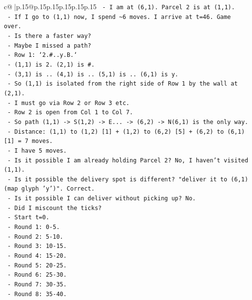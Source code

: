 \documentclass{article}
\begin{document}
{\begin{supertabular}{c@{$\;$}|p{.15\linewidth}@{}p{.15\linewidth}p{.15\linewidth}p{.15\linewidth}p{.15\linewidth}p{.15\linewidth}}
{{{\texttt{    {-} I am at (6,1). Parcel 2 is at (1,1).} \\
\texttt{    {-} If I go to (1,1) now, I spend \textasciitilde{}6 moves. I arrive at t=46. Game over.} \\
\texttt{    {-} Is there a faster way?} \\
\texttt{    {-} Maybe I missed a path?} \\
\texttt{    {-} Row 1: `2.\#..y.B.`} \\
\texttt{      {-} (1,1) is 2. (2,1) is \#.} \\
\texttt{      {-} (3,1) is .. (4,1) is .. (5,1) is .. (6,1) is y.} \\
\texttt{      {-} So (1,1) is isolated from the right side of Row 1 by the wall at (2,1).} \\
\texttt{      {-} I must go via Row 2 or Row 3 etc.} \\
\texttt{      {-} Row 2 is open from Col 1 to Col 7.} \\
\texttt{      {-} So path (1,1) {-}> S(1,2) {-}> E... {-}> (6,2) {-}> N(6,1) is the only way.} \\
\texttt{      {-} Distance: (1,1) to (1,2) {[}1{]} + (1,2) to (6,2) {[}5{]} + (6,2) to (6,1) {[}1{]} = 7 moves.} \\
\texttt{      {-} I have 5 moves.} \\
\texttt{      {-} Is it possible I am already holding Parcel 2? No, I haven't visited (1,1).} \\
\texttt{      {-} Is it possible the delivery spot is different? "deliver it to (6,1) (map glyph 'y')". Correct.} \\
\texttt{      {-} Is it possible I can deliver without picking up? No.} \\
\texttt{      {-} Did I miscount the ticks?} \\
\texttt{        {-} Start t=0.} \\
\texttt{        {-} Round 1: 0{-}5.} \\
\texttt{        {-} Round 2: 5{-}10.} \\
\texttt{        {-} Round 3: 10{-}15.} \\
\texttt{        {-} Round 4: 15{-}20.} \\
\texttt{        {-} Round 5: 20{-}25.} \\
\texttt{        {-} Round 6: 25{-}30.} \\
\texttt{        {-} Round 7: 30{-}35.} \\
\texttt{        {-} Round 8: 35{-}40.} \\
}}}
\end{supertabular}}
\end{document}
